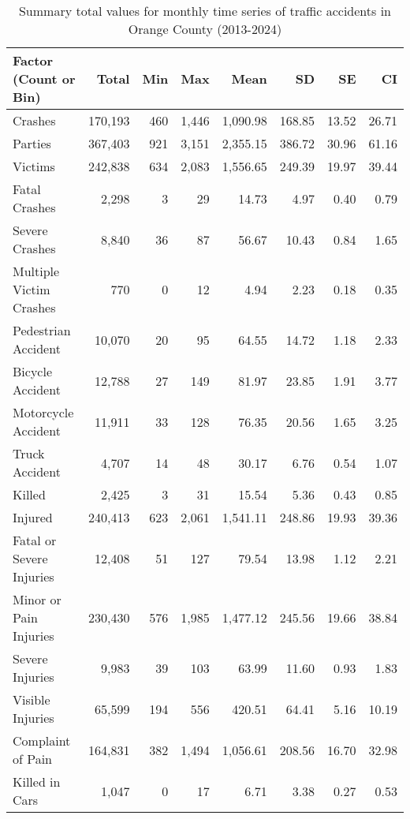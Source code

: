 \begin{table}[h]
\centering
\caption{Summary total values for monthly time series of traffic accidents in Orange County (2013-2024)} 
\label{Tbl3}
\begin{tabular}{lrrrrrrr}
  \toprule
  Factor (Count or Bin) & Total\footnotemark[2] & Min\footnotemark[1] & Max\footnotemark[1] & Mean\footnotemark[1] & SD\footnotemark[1] & SE\footnotemark[1] & CI\footnotemark[1] \\ 
 \midrule
Crashes & 170,193 & 460 & 1,446 & 1,090.98 & 168.85 & 13.52 & 26.71 \\ 
  Parties & 367,403 & 921 & 3,151 & 2,355.15 & 386.72 & 30.96 & 61.16 \\ 
  Victims & 242,838 & 634 & 2,083 & 1,556.65 & 249.39 & 19.97 & 39.44 \\ 
  Fatal Crashes & 2,298 &   3 &  29 & 14.73 & 4.97 & 0.40 & 0.79 \\ 
  Severe Crashes & 8,840 &  36 &  87 & 56.67 & 10.43 & 0.84 & 1.65 \\ 
  Multiple Victim Crashes & 770 &   0 &  12 & 4.94 & 2.23 & 0.18 & 0.35 \\ 
   \midrule 
Pedestrian Accident & 10,070 &  20 &  95 & 64.55 & 14.72 & 1.18 & 2.33 \\ 
  Bicycle Accident & 12,788 &  27 & 149 & 81.97 & 23.85 & 1.91 & 3.77 \\ 
  Motorcycle Accident & 11,911 &  33 & 128 & 76.35 & 20.56 & 1.65 & 3.25 \\ 
  Truck Accident & 4,707 &  14 &  48 & 30.17 & 6.76 & 0.54 & 1.07 \\ 
   \midrule 
Killed & 2,425 &   3 &  31 & 15.54 & 5.36 & 0.43 & 0.85 \\ 
  Injured & 240,413 & 623 & 2,061 & 1,541.11 & 248.86 & 19.93 & 39.36 \\ 
  Fatal or Severe Injuries & 12,408 &  51 & 127 & 79.54 & 13.98 & 1.12 & 2.21 \\ 
  Minor or Pain Injuries & 230,430 & 576 & 1,985 & 1,477.12 & 245.56 & 19.66 & 38.84 \\ 
  Severe Injuries & 9,983 &  39 & 103 & 63.99 & 11.60 & 0.93 & 1.83 \\ 
  Visible Injuries & 65,599 & 194 & 556 & 420.51 & 64.41 & 5.16 & 10.19 \\ 
  Complaint of Pain & 164,831 & 382 & 1,494 & 1,056.61 & 208.56 & 16.70 & 32.98 \\ 
   \midrule 
Killed in Cars & 1,047 &   0 &  17 & 6.71 & 3.38 & 0.27 & 0.53 \\ 

\end{tabular}
\end{table}

